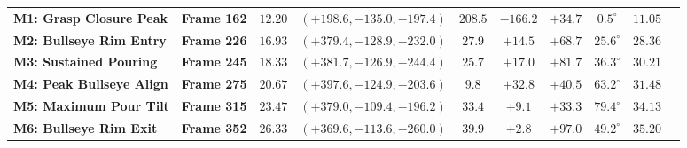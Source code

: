 \documentclass[10pt,journal]{IEEEtran}
\begin{document}
\begin{table}[t]
{\begin{tabular}{@{}llcccccccc@{}}
        \quad \textbf{M1: Grasp Closure Peak} & \textbf{Frame 162} & $\mathbf{12.20}$ & $\mathbf{(+198.6, -135.0, -197.4)}$ & $208.5$ & $-166.2$ & $+34.7$ & $0.5^\circ$ & $\mathbf{11.05}$ \\
        \quad \textbf{M2: Bullseye Rim Entry} & \textbf{Frame 226} & $\mathbf{16.93}$ & $\mathbf{(+379.4, -128.9, -232.0)}$ & $\mathbf{27.9}$ & $\mathbf{+14.5}$ & $\mathbf{+68.7}$ & $\mathbf{25.6^\circ}$ & $28.36$ \\
        \quad \textbf{M3: Sustained Pouring} & \textbf{Frame 245} & $\mathbf{18.33}$ & $\mathbf{(+381.7, -126.9, -244.4)}$ & $\mathbf{25.7}$ & $\mathbf{+17.0}$ & $\mathbf{+81.7}$ & $\mathbf{36.3^\circ}$ & $30.21$ \\
        \quad \textbf{M4: Peak Bullseye Align} & \textbf{Frame 275} & $\mathbf{20.67}$ & $\mathbf{(+397.6, -124.9, -203.6)}$ & $\mathbf{9.8}$ & $\mathbf{+32.8}$ & $\mathbf{+40.5}$ & $\mathbf{63.2^\circ}$ & $31.48$ \\
        \quad \textbf{M5: Maximum Pour Tilt} & \textbf{Frame 315} & $\mathbf{23.47}$ & $\mathbf{(+379.0, -109.4, -196.2)}$ & $\mathbf{33.4}$ & $\mathbf{+9.1}$ & $\mathbf{+33.3}$ & $\mathbf{79.4^\circ}$ & $34.13$ \\
        \quad \textbf{M6: Bullseye Rim Exit} & \textbf{Frame 352} & $\mathbf{26.33}$ & $\mathbf{(+369.6, -113.6, -260.0)}$ & $\mathbf{39.9}$ & $\mathbf{+2.8}$ & $\mathbf{+97.0}$ & $\mathbf{49.2^\circ}$ & $35.20$ \\
        \bottomrule
    \end{tabular}}
\end{table}

\begin{table}[t]
    \centering
    \caption{Comparison of Operator Viewing Modalities for Bimanual Teleoperation Assistance (Frame 245 / 275 Pouring State)}
    \label{tab:modality_comparison}
    \scriptsize
\end{table}
\end{document}
